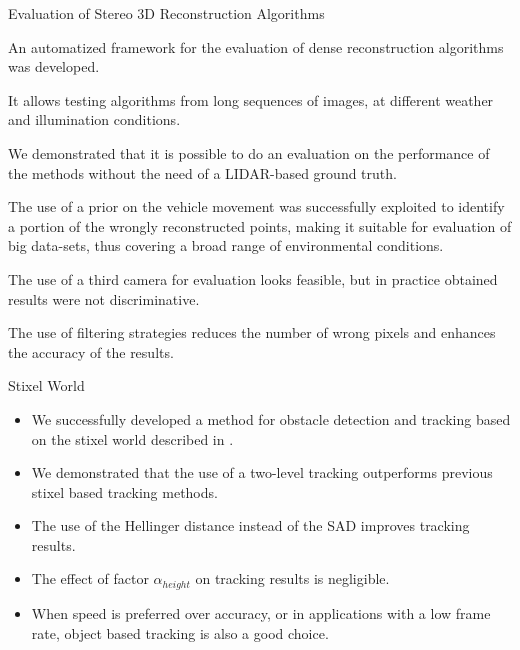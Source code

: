 \begin{frame}{Evaluation of Stereo 3D Reconstruction Algorithms}
  \small
  \begin{itemize}
   {
    \item An automatized framework for the evaluation of dense reconstruction algorithms was developed.
    \item It allows testing algorithms from long sequences of images, at different weather and illumination conditions.
    \item We demonstrated that it is possible to do an evaluation on the performance of the methods without the need of a LIDAR-based ground truth.
    }
     {
    \item The use of a prior on the vehicle movement was successfully exploited to identify a portion of the wrongly reconstructed points, making it suitable for evaluation of big data-sets, thus covering a broad range of environmental conditions. 
    \item The use of a third camera for evaluation looks feasible, but in practice obtained results were not discriminative.
    \item The use of filtering strategies reduces the number of wrong pixels and enhances the accuracy of the results. 
    }
  \end{itemize}
\end{frame}

\begin{frame}{Stixel World}
  \small
  \begin{itemize}
    \item We successfully developed a method for obstacle detection and tracking based on the stixel world described in \cite{badino2009stixel}. 
    \item We demonstrated that the use of a two-level tracking outperforms previous stixel based tracking methods. 
    \item The use of the Hellinger distance instead of the SAD improves tracking results.
    \item The effect of factor $\alpha_{height}$ on tracking results is negligible. 
    \item When speed is preferred over accuracy, or in applications with a low frame rate, object based tracking is also a good choice.
  \end{itemize}
\end{frame}

